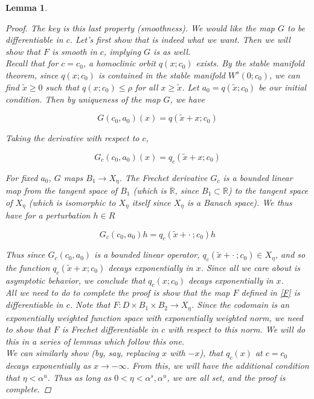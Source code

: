 \documentclass[12pt]{article}
\def\R{{\mathbb R}}
\newtheorem{lemma}{Lemma}
\begin{document}
\begin{lemma}
\begin{proof}
The key is this last property (smoothness). We would like the map $G$ to be differentiable in $c$. Let's first show that is indeed what we want. Then we will show that $F$ is smooth in $c$, implying $G$ is as well.\\

Recall that for $c = c_0$, a homoclinic orbit $q(x; c_0)$ exists. By the stable manifold theorem, since $q(x; c_0)$ is contained in the stable manifold $W^s(0; c_0)$, we can find $\tilde{x} \geq 0$ such that $q(x; c_0) \leq \rho$ for all $x \geq \tilde{x}$. Let $a_0 = q(\tilde{x}; c_0)$ be our initial condition. Then by uniqueness of the map $G$, we have 

\[
G(c_0, a_0)(x) = q(\tilde{x} + x; c_0)
\]

Taking the derivative with respect to $c$,

\[
G_c(c_0, a_0)(x) = q_c(\tilde{x} + x; c_0)
\]

For fixed $a_0$, $G$ maps $B_1 \rightarrow X_\eta$. The Frechet derivative $G_c$ is a bounded linear map from the tangent space of $B_1$ (which is $\R$, since $B_1 \subset \R$) to the tangent space of $X_\eta$ (which is isomorphic to $X_\eta$ itself since $X_\eta$ is a Banach space). We thus have for a perturbation $h \in R$

\[
G_c(c_0, a_0)h = q_c(\tilde{x} + \cdot \: ; c_0) h
\]

Thus since $G_c(c_0, a_0)$ is a bounded linear operator, $q_c(\tilde{x} + \cdot \: ; c_0) \in X_\eta$, and so the function $q_c(\tilde{x} + x ; c_0)$ decays exponentially in $x$. Since all we care about is asymptotic behavior, we conclude that $q_c(x ; c_0)$ decays exponentially in $x$.\\

All we need to do to complete the proof is show that the map $F$ defined in \eqref{F} is differentiable in $c$. Note that $F: D \times B_1 \times B_2 \rightarrow X_\eta$. Since the codomain is an exponentially weighted function space with exponentially weighted norm, we need to show that $F$ is Frechet differentiable in $c$ with respect to this norm. We will do this in a series of lemmas which follow this one. \\

We can similarly show (by, say, replacing $x$ with $-x$), that $q_c(x)$ at $c = c_0$ decays exponentially as $x \rightarrow -\infty$. From this, we will have the additional condition that $\eta < \alpha^u$. Thus as long as $0 < \eta < \alpha^s, \alpha^u$, we are all set, and the proof is complete.

\end{proof}
\end{lemma}
\end{document}
